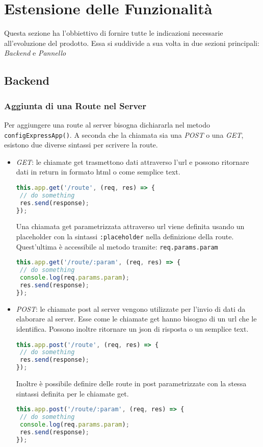\section{Estensione delle Funzionalità}\label{Estensione}
Questa sezione ha l'obbiettivo di fornire tutte le indicazioni necessarie all'evoluzione del prodotto. 
Essa si suddivide a sua volta in due sezioni principali: \textit{Backend} e \textit{Pannello}

\subsection{Backend}\label{Estensione_Server}
\subsubsection{Aggiunta di una Route nel Server}\label{ExtAddRoute}
Per aggiungere una route al server bisogna dichiararla nel metodo \texttt{configExpressApp()}. 
A seconda che la chiamata sia una \textit{POST} o una \textit{GET}, esistono due diverse sintassi per scrivere la route.
\begin{itemize}
 \item \textit{GET}: le chiamate get trasmettono dati attraverso l'url e possono ritornare dati in return in formato html o come semplice text.
\begin{lstlisting}[language=JavaScript]
this.app.get('/route', (req, res) => {
 // do something
 res.send(response);
});
\end{lstlisting} 
Una chiamata get parametrizzata attraverso url viene definita usando un placeholder con la sintassi \texttt{:placeholder} nella definizione della route. Quest'ultima è accessibile al metodo tramite: \texttt{req.params.param}
\begin{lstlisting}[language=JavaScript]
this.app.get('/route/:param', (req, res) => {
 // do something
 console.log(req.params.param);
 res.send(response);
});
\end{lstlisting}
\item \textit{POST}: le chiamate post al server vengono utilizzate per l'invio di dati da elaborare al server. Esse come le chiamate get hanno bisogno di un url che le identifica. Possono inoltre ritornare un json di risposta o un semplice text. 
\begin{lstlisting}[language=JavaScript]
this.app.post('/route', (req, res) => {
 // do something
 res.send(response);
});
\end{lstlisting} 
Inoltre è possibile definire delle route in post parametrizzate con la stessa sintassi definita per le chiamate get. 
\begin{lstlisting}[language=JavaScript]
this.app.post('/route/:param', (req, res) => {
 // do something
 console.log(req.params.param);
 res.send(response);
});
\end{lstlisting}
\end{itemize}

